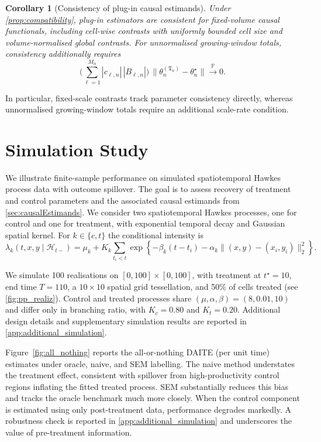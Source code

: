 \documentclass{statsoc}
\newtheorem{corollary}[corollary]{Corollary}
\newcommand{\1}{\mathbbm{1}}
\newcommand{\Tmax}{\mathfrak{T}}
\begin{document}
\begin{corollary}[Consistency of plug-in causal estimands]\label{cor:estimands-compat}
Under \cref{prop:compatibility}, plug-in estimators are consistent for fixed-volume causal functionals, including cell-wise contrasts with uniformly bounded cell size and volume-normalised global contrasts. For unnormalised growing-window totals, consistency additionally requires
\[
\Big(\sum_{\ell=1}^{M_n}|c_{\ell,n}|\,|B_{\ell,n}|\Big)\,
\|\theta_n^{(\Tmax_n)}-\theta_n^\star\|
\xrightarrow{\mathbb P}0.
\]
\end{corollary}

In particular, fixed-scale contrasts track parameter consistency directly, whereas unnormalised growing-window totals require an additional scale-rate condition.

\section{Simulation Study}\label{sec:simulation_study}

We illustrate finite-sample performance on simulated spatiotemporal Hawkes  process data with outcome spillover. The goal is to assess recovery of treatment and control parameters and the associated causal estimands from \cref{sec:causalEstimands}. We consider two spatiotemporal Hawkes processes, one for control and one for treatment, with exponential temporal decay and Gaussian spatial kernel. For $k\in\{c,t\}$ the conditional intensity is
\begin{equation*}
\lambda_k(t,x,y \mid \mathcal{H}_{t-}) = \mu_k + K_k \sum_{t_i < t} \exp\!\left\{-\beta_k (t-t_i)
- \alpha_k  \big\|(x,y) - (x_i,y_i)\big\|_{2}^{2} \right\}. 
\end{equation*}

We simulate 100 realisations on \([0,100]\times[0,100]\), with treatment at \(t^\star=10\), end time \(T=110\), a \(10\times10\) spatial grid tessellation, and 50\% of cells treated (see \cref{fig:pp_realiz}). Control and treated processes share \((\mu,\alpha,\beta)=(8,0.01,10)\) and differ only in branching ratio, with \(K_c=0.80\) and \(K_t=0.20\). Additional design details and supplementary simulation results are reported in \cref{app:additional_simulation}.

Figure~\ref{fig:all_nothing} reports the all-or-nothing DAITE (per unit time) estimates under oracle, naive, and SEM labelling. The naive method understates the treatment effect, consistent with spillover from high-productivity control regions inflating the fitted treated process. SEM substantially reduces this bias and tracks the oracle benchmark much more closely. When the control component is estimated using only post-treatment data, performance degrades markedly. A robustness check is reported in \cref{app:additional_simulation} and underscores the value of pre-treatment information.
\end{document}
